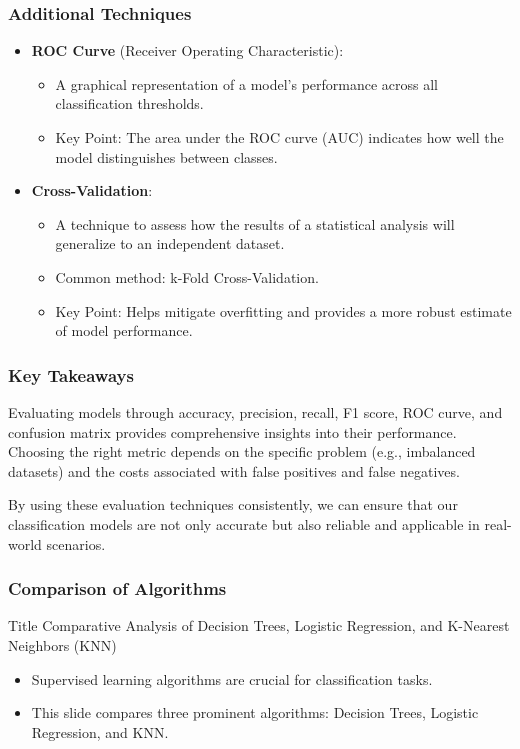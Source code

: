 \documentclass[aspectratio=169]{beamer}
\begin{document}
\begin{frame}[fragile]
    \frametitle{Additional Techniques}
    \begin{itemize}
        \item \textbf{ROC Curve} (Receiver Operating Characteristic):
        \begin{itemize}
            \item A graphical representation of a model’s performance across all classification thresholds.
            \item Key Point: The area under the ROC curve (AUC) indicates how well the model distinguishes between classes.
        \end{itemize}

        \item \textbf{Cross-Validation}:
        \begin{itemize}
            \item A technique to assess how the results of a statistical analysis will generalize to an independent dataset.
            \item Common method: k-Fold Cross-Validation.
            \item Key Point: Helps mitigate overfitting and provides a more robust estimate of model performance.
        \end{itemize}
    \end{itemize}
\end{frame}

\begin{frame}[fragile]
    \frametitle{Key Takeaways}
    Evaluating models through accuracy, precision, recall, F1 score, ROC curve, and confusion matrix provides comprehensive insights into their performance. Choosing the right metric depends on the specific problem (e.g., imbalanced datasets) and the costs associated with false positives and false negatives.

    By using these evaluation techniques consistently, we can ensure that our classification models are not only accurate but also reliable and applicable in real-world scenarios.
\end{frame}

\begin{frame}[fragile]
    \frametitle{Comparison of Algorithms}
    \begin{block}{Title}
        Comparative Analysis of Decision Trees, Logistic Regression, and K-Nearest Neighbors (KNN)
    \end{block}
    \begin{itemize}
        \item Supervised learning algorithms are crucial for classification tasks.
        \item This slide compares three prominent algorithms: 
        Decision Trees, Logistic Regression, and KNN.
    \end{itemize}
\end{frame}
\end{document}
